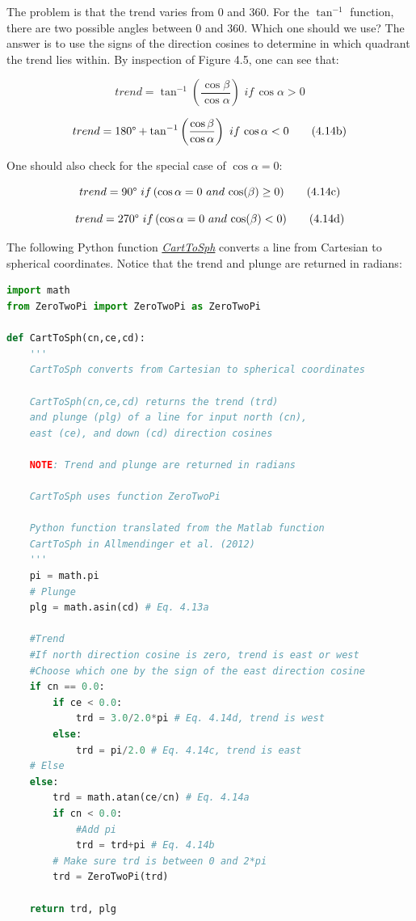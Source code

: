 \documentclass[a4paper , 12pt]{book}
\begin{document}
The problem is that the trend varies from 0 and 360\degree. For the $\tan^{-1}$ function, there are two possible angles between 0 and 360\degree. Which one should we use? The answer is to use the signs of the direction cosines to determine in which quadrant the trend lies within. By inspection of Figure 4.5, one can see that:

\begin{equation}
    trend = \tan^{-1}\left(\frac{\cos\beta}{\cos\alpha}\right)\,\,if\,\cos\alpha>0 \tag{4.14a}
\end{equation}

\begin{equation}
    trend = 180\degree+\tan^{-1}\left(\frac{\cos\beta}{\cos\alpha}\right)\,\,if\,\cos\alpha<0 \tag{4.14b}
\end{equation}

One should also check for the special case of $\cos\alpha=0$:

\begin{equation}
    trend = 90\degree\,\,if\,(\cos\alpha = 0\,\,and\,\cos(\beta)\geq 0) \tag{4.14c}
\end{equation}

\begin{equation}
    trend = 270\degree\,\,if\,(\cos\alpha = 0\,\,and\,\cos(\beta)< 0) \tag{4.14d}
\end{equation}

The following Python function \href{http://github.com}{\textit{CartToSph}} converts a line from Cartesian to spherical coordinates. Notice that the trend and plunge are returned in radians:

\begin{center}
\begin{lstlisting}[language=Python, frame=single]
import math
from ZeroTwoPi import ZeroTwoPi as ZeroTwoPi

def CartToSph(cn,ce,cd):
    '''
    CartToSph converts from Cartesian to spherical coordinates 

    CartToSph(cn,ce,cd) returns the trend (trd)
    and plunge (plg) of a line for input north (cn), 
    east (ce), and down (cd) direction cosines

    NOTE: Trend and plunge are returned in radians

    CartToSph uses function ZeroTwoPi
    
    Python function translated from the Matlab function 
    CartToSph in Allmendinger et al. (2012)
    '''
    pi = math.pi
    # Plunge 
    plg = math.asin(cd) # Eq. 4.13a
    
    #Trend
    #If north direction cosine is zero, trend is east or west
    #Choose which one by the sign of the east direction cosine
    if cn == 0.0:
        if ce < 0.0:
            trd = 3.0/2.0*pi # Eq. 4.14d, trend is west
        else:
            trd = pi/2.0 # Eq. 4.14c, trend is east
    # Else
    else:
        trd = math.atan(ce/cn) # Eq. 4.14a
        if cn < 0.0:
            #Add pi 
            trd = trd+pi # Eq. 4.14b
        # Make sure trd is between 0 and 2*pi
        trd = ZeroTwoPi(trd)
    
    return trd, plg
\end{lstlisting}    
\end{center}
\end{document}
